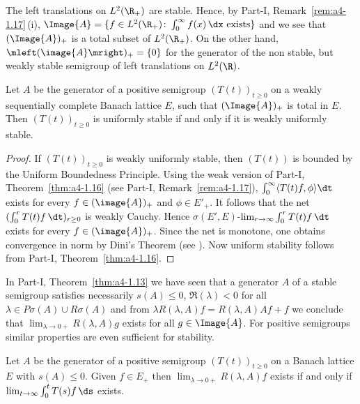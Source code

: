 The left translations on $L^{2}(\R_{+})$ are stable.
Hence, by Part-I, Remark~\ref{rem:a4-1.17}\,(i), $\Image{A} = \{f \in L^{2}(\R_{+}) \colon \int_{0}^{\infty} f(x) \, \dx \text{ exists}\}$ and we see that $(\Image{A})_{+}$ is a total subset of\/ $L^{2}(\R_{+})$.
On the other hand, $\mleft(\image{A}\mright)_{+} = \{0\}$ for the generator of the non stable, but weakly stable semigroup of left translations on $L^{2}(\R)$.
\begin{proposition}\label{prop:c4-1.7}
%
Let $A$ be the generator of a positive semigroup $(T(t))_{t\geq 0}$ on a weakly sequentially complete Banach lattice $E$, such that $(\Image{A})_{+}$ is total in $E$.
Then $(T(t))_{t\geq 0}$ is uniformly stable if and only if it is weakly uniformly stable.
\end{proposition}
\begin{proof}
If\/ $(T(t))_{t\geq 0}$ is weakly uniformly stable, then $(T(t))$ is bounded by the Uniform Boundedness Principle.
Using the weak version of Part-I, Theorem~\ref{thm:a4-1.16} (see Part-I, Remark~\ref{rem:a4-1.17}), 
$\int_{0}^{\infty} \langle T(t)f,\phi \rangle \dt$ exists for every $f \in (\image{A})_{+}$ and $\phi \in E'_{+}$.
It follows that the net $(\int_{0}^{r} T(t)f \, \dt)_{r\geq 0}$ is weakly Cauchy.
Hence $\sigma(E',E)$-$\lim_{r \to \infty} \int_{0}^{r} T(t)f \, \dt$ exists for every $f \in (\image{A})_{+}$.
Since the net is monotone, one obtains convergence in norm by Dini's Theorem (see \textcite [II. Theorem~5.9]{schaefer:1974}).
Now uniform stability follows from Part-I, Theorem~\ref{thm:a4-1.16}.
\end{proof}
In Part-I, Theorem~\ref{thm:a4-1.13} we have seen that a generator $A$ of a stable semigroup satisfies necessarily $s(A) \leq 0$, $\Re(\lambda) < 0$ for all $\lambda \in P{\sigma}(A) \cup R{\sigma}(A)$ and from $\lambda R(\lambda,A)f = R(\lambda,A)Af + f$ we conclude that $\lim_{\lambda \to 0+} R(\lambda,A)g$ exists for all $g \in \Image{A}$. 
For positive semigroups similar properties are even sufficient for stability.
\begin{lemma}\label{lem:c4-1.8}
%
Let $A$ be the generator of a positive semigroup $(T(t))_{t\geq 0}$ on a Banach lattice $E$ with $s(A) \leq 0$.
Given $f \in E_{+}$ then $\lim_{\lambda \to 0+} R(\lambda,A)f$ exists if and only if\/ $\lim_{t \to \infty} \int_{0}^{t} T(s)f \, \ds$ exists.
\end{lemma}

